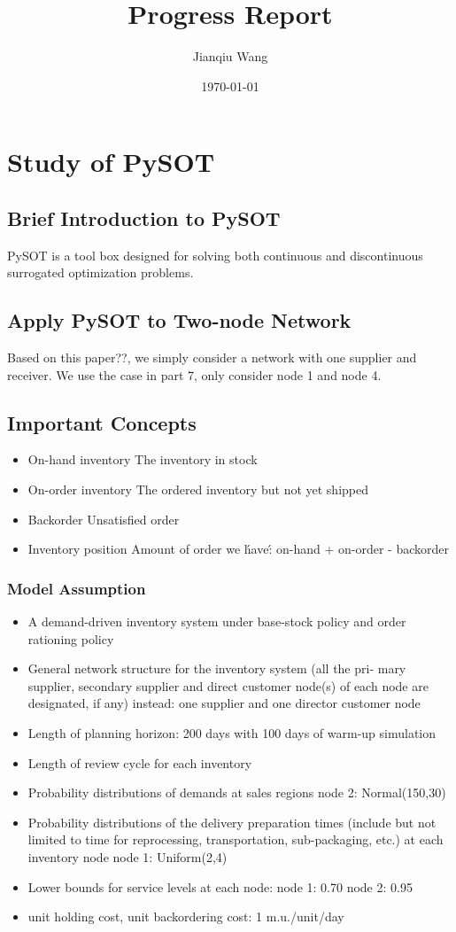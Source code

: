 \documentclass[letterpaper]{article}
\begin{document}
\title{ Progress Report}
\author{Jianqiu Wang}
\date{\today}
\maketitle
\section{Study of PySOT}
\subsection{Brief Introduction to PySOT}
PySOT is a tool box designed for solving both continuous and discontinuous surrogated optimization problems.
\subsection{Apply PySOT to Two-node Network}
Based on this paper??, we simply consider a network with one supplier and receiver. We use the case in part 7, only consider node 1 and node 4.
\subsection{Important Concepts}
\begin{itemize}
\item{On-hand inventory} The inventory in stock
\item{On-order inventory} The ordered inventory but not yet shipped
\item{Backorder} Unsatisfied order
\item{Inventory position} Amount of order we \'have\': on-hand + on-order - backorder
\end{itemize}

\subsubsection{Model Assumption}
\begin{itemize}
\item A demand-driven inventory system under base-stock policy and order rationing policy
\item General network structure for the inventory system (all the pri- mary supplier, secondary supplier and direct customer node(s) of each node are designated, if any)
instead: one supplier and one director customer node
\item Length of planning horizon: 200 days with 100 days of warm-up simulation
\item Length of review cycle for each inventory
\item Probability distributions of demands at sales regions
node 2: Normal(150,30)
\item Probability distributions of the delivery preparation times
(include but not limited to time for reprocessing, transportation,
sub-packaging, etc.) at each inventory node 
node 1: Uniform(2,4) 
\item Lower bounds for service levels at each node:
node 1: 0.70
node 2: 0.95
\item unit holding cost, unit backordering cost: 1 m.u./unit/day
\end{itemize}
\end{document}
